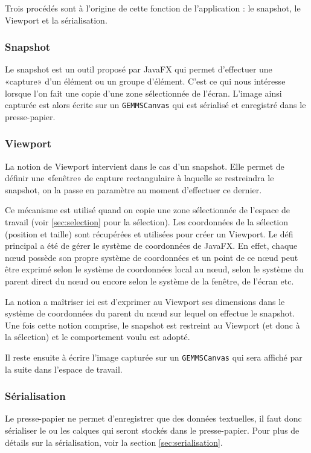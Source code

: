 Trois procédés sont à l'origine de cette fonction de l'application : le snapshot, le Viewport et la sérialisation.


\subsubsection{Snapshot}
Le snapshot est un outil proposé par JavaFX qui permet d'effectuer une «capture» d'un élément ou un groupe d'élément. C'est ce qui nous intéresse lorsque l'on fait une copie d'une zone sélectionnée de l'écran. L'image ainsi capturée est alors écrite sur un \texttt{GEMMSCanvas} qui est sérialisé et enregistré dans le presse-papier.

\subsubsection{Viewport}
La notion de Viewport intervient dans le cas d'un snapshot. Elle permet de définir une «fenêtre» de capture rectangulaire à laquelle se restreindra le snapshot, on la passe en paramètre au moment d'effectuer ce dernier.

Ce mécanisme est utilisé quand on copie une zone sélectionnée de l'espace de travail (voir \ref{sec:selection} pour la sélection). Les coordonnées de la sélection (position et taille) sont récupérées et utilisées pour créer un Viewport. Le défi principal a été de gérer le système de coordonnées de JavaFX. En effet, chaque n\oe ud possède son propre système de coordonnées et un point de ce n\oe ud peut être exprimé selon le système de coordonnées local au n\oe ud, selon le système du parent direct du n\oe ud ou encore selon le système de la fenêtre, de l'écran etc.

La notion a maîtriser ici est d'exprimer au Viewport ses dimensions dans le système de coordonnées du parent du n\oe ud sur lequel on effectue le snapshot. Une fois cette notion comprise, le snapshot est restreint au Viewport (et donc à la sélection) et le comportement voulu est adopté.

Il reste ensuite à écrire l'image capturée sur un \texttt{GEMMSCanvas} qui sera affiché par la suite dans l'espace de travail.

\subsubsection{Sérialisation}
Le presse-papier ne permet d'enregistrer que des données textuelles, il faut donc sérialiser le ou les calques qui seront stockés dans le presse-papier. Pour plus de détails sur la sérialisation, voir la section \ref{sec:serialisation}.

